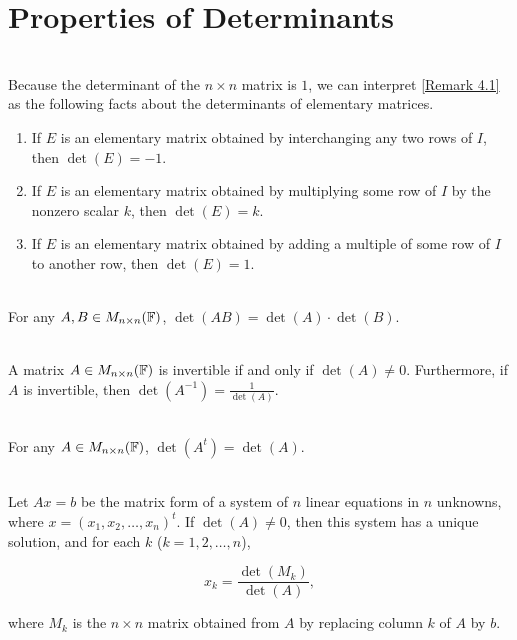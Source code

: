 \section{Properties of Determinants}

\begin{remark}
	\hfill\\
	Because the determinant of the $n \times n$ matrix is $1$, we can interpret \autoref{Remark 4.1} as the following facts about the determinants of elementary matrices.
	
	\begin{enumerate}
		\item If $E$ is an elementary matrix obtained by interchanging any two rows of $I$, then $\det(E) = -1$.
		\item If $E$ is an elementary matrix obtained by multiplying some row of $I$ by the nonzero scalar $k$, then $\det(E) = k$.
		\item If $E$ is an elementary matrix obtained by adding a multiple of some row of $I$ to another row, then $\det(E) = 1$.
	\end{enumerate}
\end{remark}

\begin{theorem}
	\hfill\\
	For any $A, B \in M_{n \times n}(\mathbb{F})$, $\det(AB) = \det(A) \cdot \det(B)$.
\end{theorem}

\begin{corollary}
	\hfill\\
	A matrix $A \in M_{n \times n}(\mathbb{F})$ is invertible if and only if $\det(A) \neq 0$. Furthermore, if $A$ is invertible, then $\det(A^{-1}) = \displaystyle\frac{1}{\det(A)}$.
\end{corollary}

\begin{theorem}
	\hfill\\
	For any $A \in M_{n \times n}(\mathbb{F})$, $\det(A^t)=\det(A)$.
\end{theorem}

\begin{theorem}
	\hfill\\
	Let $Ax = b$ be the matrix form of a system of $n$ linear equations in $n$ unknowns, where $x = (x_1, x_2, \dots, x_n)^t$. If $\det(A) \neq 0$, then this system has a unique solution, and for each $k$ ($k = 1, 2, \dots, n$), 
	
	\[x_k = \frac{\det(M_k)}{\det(A)},\]
	
	where $M_k$ is the $n \times n$ matrix obtained from $A$ by replacing column $k$ of $A$ by $b$.
\end{theorem}

